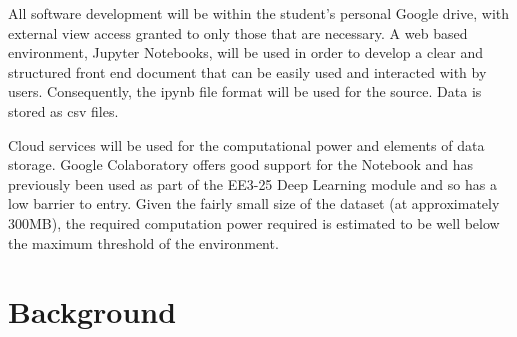 \documentclass[10pt,onecolumn,letterpaper]{article}
\begin{document}
All software development will be within the student's personal Google drive, with external view access granted to only those that are necessary. A web based environment, Jupyter Notebooks\cite{jupyter_notebook}, will be used in order to develop a clear and structured front end document that can be easily used and interacted with by users. Consequently, the ipynb file format will be used for the source. Data is stored as csv files. 

Cloud services will be used for the computational power and elements of data storage. Google Colaboratory offers good support for the Notebook and has previously been used as part of the EE3-25 Deep Learning module and so has a low barrier to entry. Given the fairly small size of the dataset (at approximately 300MB), the required computation power required is estimated to be well below the maximum threshold of the environment. 

\section{Background}
\end{document}
